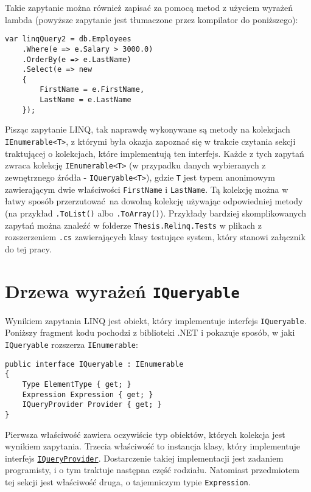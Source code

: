 Takie zapytanie można również zapisać za pomocą metod z użyciem wyrażeń lambda (powyższe zapytanie jest tłumaczone przez kompilator do poniższego): \pagebreak

\begin{lstlisting}
var linqQuery2 = db.Employees
    .Where(e => e.Salary > 3000.0)
    .OrderBy(e => e.LastName)
    .Select(e => new
    { 
        FirstName = e.FirstName,
        LastName = e.LastName
    });
\end{lstlisting}

Pisząc zapytanie LINQ, tak naprawdę wykonywane są metody na kolekcjach \texttt{IEnumerable<T>}, z którymi była okazja zapoznać się w trakcie czytania sekcji traktującej o kolekcjach, które implementują ten interfejs. Każde z tych zapytań zwraca kolekcję \texttt{IEnumerable<T>} (w przypadku danych wybieranych z zewnętrznego źródła - \texttt{IQueryable<T>}), gdzie \texttt{T} jest typem anonimowym zawierającym dwie właściwości \texttt{FirstName} i \texttt{LastName}. Tą kolekcję można w łatwy sposób przerzutować na dowolną kolekcję używając odpowiedniej metody (na przykład \texttt{.ToList()} albo \linebreak \texttt{.ToArray()}). Przykłady bardziej skomplikowanych zapytań można znaleźć w folderze \texttt{Thesis.Relinq.Tests} w plikach z rozszerzeniem \texttt{.cs} zawierających klasy testujące system, który stanowi załącznik do tej pracy.

\section{Drzewa wyrażeń \texttt{IQueryable}}
Wynikiem zapytania LINQ jest obiekt, który implementuje interfejs \texttt{IQueryable}. Poniższy fragment kodu pochodzi z biblioteki .NET i pokazuje sposób, w jaki \linebreak \texttt{IQueryable} rozszerza \texttt{IEnumerable}:

\begin{lstlisting}
public interface IQueryable : IEnumerable
{
    Type ElementType { get; }
    Expression Expression { get; }
    IQueryProvider Provider { get; }
}
\end{lstlisting}

Pierwsza właściwość zawiera oczywiście typ obiektów, których kolekcja jest wynikiem zapytania. Trzecia właściwość to instancja klasy, który implementuje interfejs \href{https://msdn.microsoft.com/pl-pl/library/system.linq.iqueryprovider(v=vs.110).aspx}{\texttt{IQueryProvider}}. Dostarczenie takiej implementacji jest zadaniem programisty, i o tym traktuje następna część rodziału. Natomiast przedmiotem tej sekcji jest właściwość druga, o tajemniczym typie \texttt{Expression}.

